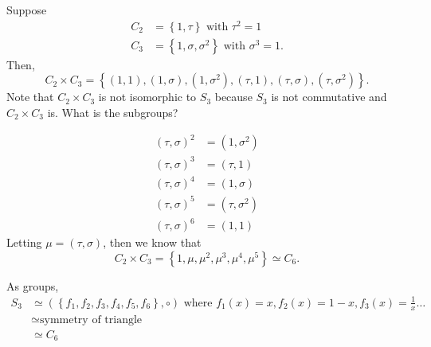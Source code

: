 \begin{eg}
    Suppose 
    \begin{align*}
        C_2 &= \left\{ 1, \tau  \right\} \text{ with } \tau ^2 = 1 \\
        C_3 &= \left\{ 1, \sigma , \sigma ^2 \right\} \text{ with } \sigma ^3 = 1.  
    \end{align*}
    Then, 
    \[
        C_2 \times C_3 = \left\{ (1, 1), (1, \sigma ), (1, \sigma ^2), (\tau ,1), (\tau , \sigma ), (\tau, \sigma^2) \right\}. 
    \]
    Note that \(C_2 \times C_3\) is not isomorphic to \(S_3\) because \(S_3\) is not commutative and \(C_2 \times C_3\) is. What is the subgroups?   
\end{eg}
\begin{explanation}
    \begin{align*}
        (\tau , \sigma )^2 &= (1, \sigma ^2) \\
        (\tau , \sigma )^3 &= (\tau ,1) \\
        (\tau , \sigma )^4 &= (1, \sigma ) \\
        (\tau , \sigma )^5 &= (\tau , \sigma ^2) \\
        (\tau , \sigma )^6 &= (1, 1)
    \end{align*}
    Letting \(\mu = (\tau , \sigma )\), then we know that 
    \[
        C_2 \times C_3 = \left\{ 1, \mu , \mu ^2, \mu ^3, \mu ^4, \mu ^5 \right\} \simeq  C_6. 
    \] 
\end{explanation}
As groups, 
\begin{align*}
    S_3 &\simeq \left( \left\{ f_1, f_2, f_3, f_4, f_5, f_6 \right\}, \circ  \right) \text{ where } f_1(x) = x, f_2(x) = 1-x, f_3(x) = \frac{1}{x} \dots \\
    &\simeq  \text{symmetry of triangle} \\
    &\simeq C_6
\end{align*}
